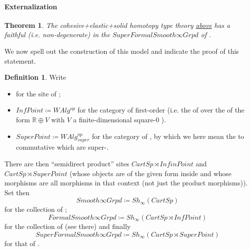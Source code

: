 \documentclass[12pt,titlepage]{article}
\theoremstyle{plain}
\newtheorem{theorem}{Theorem}
\theoremstyle{definition}
\newtheorem{defn}{Definition}
\theoremstyle{remark}
\begin{document}
\hypertarget{Externalization}{}\paragraph*{{Externalization}}\label{Externalization}
\begin{theorem}
\label{SupergeometryIsModel}\hypertarget{SupergeometryIsModel}{}
The cohesive+elastic+solid homotopy type theory \hyperlink{ObjectiveLogic}{above} has a faithful (i.e. non-degenerate)  in the  $SuperFormalSmooth\infty Grpd$ of .
\end{theorem}
We now spell out the construction of this model and indicate the proof of this statement.
\begin{defn}
\label{SupergeometricModel}\hypertarget{SupergeometricModel}{}
Write
\begin{itemize}%
\item {} for the site of ;
\item $InfPoint \coloneqq WAlg^{op}$ for the category of first-order  (i.e. the  of  over the  of the form $\mathbb{R}\oplus V$ with $V$ a finite-dimensional square-0 ).
\item $SuperPoint \coloneqq WAlg_{super}^{op}$ for the category of , by which we here mean the  to commutative  which are super-.
\end{itemize}
There are then ``semidirect product'' sites $CartSp \rtimes InfinPoint$ and $CartSp \rtimes SuperPoint$ (whose objects are  of the given form inside  and whose morphisms are all morphisms in that context (not just the product morphisms)).
Set then
\begin{displaymath}
Smooth \infty Grpd \coloneqq Sh_\infty(CartSp)
\end{displaymath}
for the collection of ;
\begin{displaymath}
FormalSmooth\infty Grpd \coloneqq Sh_\infty(CartSp \rtimes InfPoint)
\end{displaymath}
for the collection of  (see there) and finally
\begin{displaymath}
SuperFormalSmooth\infty Grpd \coloneqq Sh_\infty(CartSp \rtimes SuperPoint)
\end{displaymath}
for that of .
\end{defn}
\end{document}
